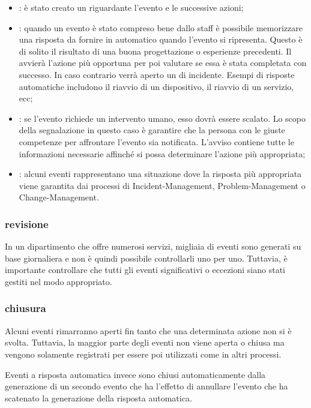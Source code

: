 \begin{itemize}
\item{: è stato creato un  riguardante l'evento e le successive azioni;}
\item{: quando un evento è stato compreso bene dallo staff è possibile memorizzare una risposta da fornire in automatico quando l'evento si ripresenta. Questo è di solito il risultato di una buona progettazione o esperienze precedenti. Il  avvierà l'azione più opportuna per poi valutare se essa è stata completata con successo. In caso contrario verrà aperto un  di incidente. Esempi di risposte automatiche includono il riavvio di un dispositivo, il riavvio di un servizio, ecc;}
\item{: se l'evento richiede un intervento umano, esso dovrà essere scalato. Lo scopo della segnalazione in questo caso è garantire che la persona con le giuste competenze per affrontare l'evento sia notificata. L'avviso contiene tutte le informazioni necessarie affinché si possa determinare l'azione più appropriata;}
\item{: alcuni eventi rappresentano una situazione dove la risposta più appropriata viene garantita dai processi di \ac{Incident-Management}, \ac{Problem-Management} o \ac{Change-Management}.}
\end{itemize}

\subsubsection[Revisione]{revisione}
In un dipartimento che offre numerosi servizi, migliaia di eventi sono generati su base giornaliera e non è quindi possibile controllarli uno per uno. Tuttavia, è importante controllare che tutti gli eventi significativi o eccezioni siano stati gestiti nel modo appropriato.

\subsubsection[Chiusura]{chiusura}
Alcuni eventi rimarranno aperti fin tanto che una determinata azione non si è svolta. Tuttavia, la maggior parte degli eventi non viene aperta o chiusa ma vengono solamente registrati per essere poi utilizzati come  in altri processi.

Eventi a risposta automatica invece sono chiusi automaticamente dalla generazione di un secondo evento che ha l'effetto di annullare l'evento che ha scatenato la generazione della risposta automatica.


